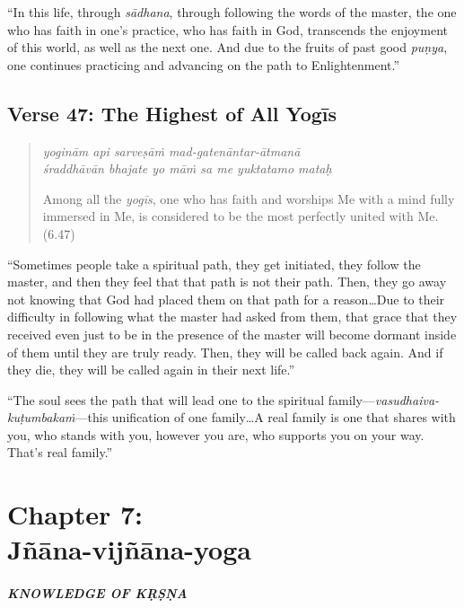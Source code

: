 \documentclass[12pt, twoside, openright]{memoir}
\begin{document}
\enquote{In this life, through \textit{sādhana}, through following the words of the master, the one who has faith in one’s practice, who has faith in God, transcends the enjoyment of this world, as well as the next one. And due to the fruits of past good \textit{puṇya}, one continues practicing and advancing on the path to Enlightenment.}

\section{Verse 47: The Highest of All Yogīs}\label{sec-verse-47-the-highest-of-all-yogis}

\par
\begin{verse}
\textit{yoginām api sarveṣāṁ mad-gatenāntar-ātmanā} \\
\textit{śraddhāvān bhajate yo māṁ sa me yuktatamo mataḥ}

\noindent Among all the \textit{yogīs}, one who has faith and worships Me with a mind fully immersed in Me, is considered to be the most perfectly united with Me. (6.47)
\end{verse}
\par


\enquote{Sometimes people take a spiritual path, they get initiated, they follow the master, and then they feel that that path is not their path. Then, they go away not knowing that God had placed them on that path for a reason\ldots Due to their difficulty in following what the master had asked from them, that grace that they received even just to be in the presence of the master will become dormant inside of them until they are truly ready. Then, they will be called back again. And if they die, they will be called again in their next life.}

\enquote{The soul sees the path that will lead one to the spiritual family---\textit{vasudhaiva-kuṭumbakaṁ}---this unification of one family\ldots A real family is one that shares with you, who stands with you, however you are, who supports you on your way. That’s real family.}
 \chapter{Chapter 7: \\Jñāna-vijñāna-yoga}\label{chap-jnana-vijnana-yoga}

\paragraph*{\MakeUppercase{Knowledge of Kṛṣṇa}}
\end{document}

